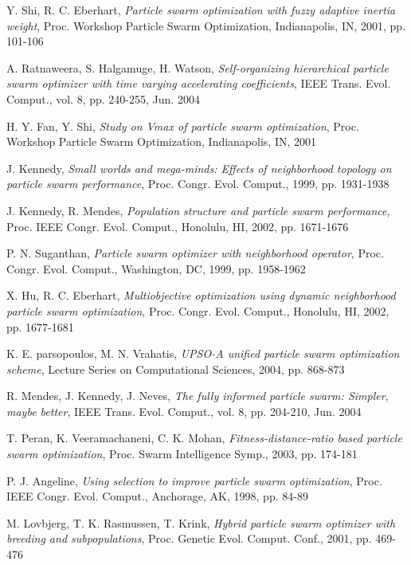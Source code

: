 \documentclass[12pt, twoside, openany, abstract=on]{report}
\theoremstyle{definition}
\begin{document}
\begin{thebibliography}{11}
 Y. Shi, R. C. Eberhart, \emph{Particle swarm optimization with fuzzy adaptive inertia weight}, Proc. Workshop Particle Swarm Optimization, Indianapolis, IN, 2001, pp. 101-106

 A. Ratnaweera, S. Halgamuge, H. Watson, \emph{Self-organizing hierarchical particle swarm optimizer with time varying accelerating coefficients}, IEEE Trans. Evol. Comput., vol. 8, pp. 240-255, Jun. 2004

 H. Y. Fan, Y. Shi, \emph{Study on Vmax of particle swarm optimization}, Proc. Workshop Particle Swarm Optimization, Indianapolis, IN, 2001

 J. Kennedy, \emph{Small worlds and mega-minds: Effects of neighborhood topology on particle swarm performance}, Proc. Congr. Evol. Comput., 1999, pp. 1931-1938

 J. Kennedy, R. Mendes, \emph{Population structure and particle swarm performance}, Proc. IEEE Congr. Evol. Comput., Honolulu, HI, 2002, pp. 1671-1676

 P. N. Suganthan, \emph{Particle swarm optimizer with neighborhood operator}, Proc. Congr. Evol. Comput., Washington, DC, 1999, pp. 1958-1962

 X. Hu, R. C. Eberhart, \emph{Multiobjective optimization using dynamic neighborhood particle swarm optimization}, Proc. Congr. Evol. Comput., Honolulu, HI, 2002, pp. 1677-1681

 K. E. parsopoulos, M. N. Vrahatis, \emph{UPSO-A unified particle swarm optimization scheme}, Lecture Series on Computational Sciences, 2004, pp. 868-873

 R. Mendes, J. Kennedy, J. Neves, \emph{The fully informed particle swarm: Simpler, maybe better}, IEEE Trans. Evol. Comput., vol. 8, pp. 204-210, Jun. 2004

 T. Peran, K. Veeramachaneni, C. K. Mohan, \emph{Fitness-distance-ratio based particle swarm optimization}, Proc. Swarm Intelligence Symp., 2003, pp. 174-181

 P. J. Angeline, \emph{Using selection to improve particle swarm optimization}, Proc. IEEE Congr. Evol. Comput., Anchorage, AK, 1998, pp. 84-89

 M. Lovbjerg, T. K. Rasmussen, T. Krink, \emph{Hybrid particle swarm optimizer with breeding and subpopulations}, Proc. Genetic Evol. Comput. Conf., 2001, pp. 469-476


\end{thebibliography}
\end{document}
